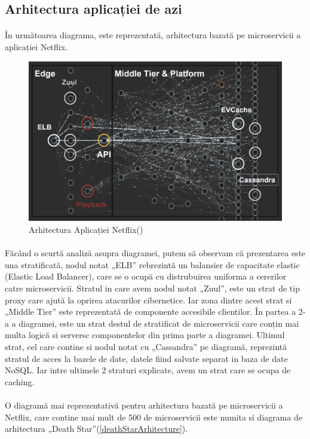\documentclass[12pt]{report}
\begin{document}
	\subsection{Arhitectura aplicației de azi}
	\paragraph{}În următoarea diagrama, este reprezentată, arhitectura bazată pe microservicii a aplicației Netflix.
	\begin{figure}[h]
  	\includegraphics[scale=.651]{netflixarhitecuture}
	\caption{Arhitectura Aplicației Netflix()}  
  	\end{figure}
  	\paragraph{}Făcând o scurtă analiză asupra diagramei, putem să observam că prezentarea este una stratificată, nodul notat „ELB” rebrezintă un balansier de capacitate elastic (Elastic Load Balancer), care se o ocupă cu distrubuirea uniforma a cererilor catre microservicii. Stratul in care avem nodul notat „Zuul”, este un strat de tip proxy care ajută la oprirea atacurilor cibernetice. Iar zona dintre acest strat si „Middle Tier” este reprezentată de componente accesibile clientilor. În partea a 2-a a diagramei, este un strat destul de stratificat de microservicii care conțin mai multa logică si serversc componentelor din prima parte a diagramei. Ultimul strat, cel care contine si nodul notat cu „Cassandra” pe diagramă, reprezintă stratul de acces la bazele de date, datele fiind salvate separat in baza de date NoSQL. Iar intre ultimele 2 straturi   explicate, avem un strat care se ocupa de caching.
  	\paragraph{}O diagramă mai reprezentativă pentru arhitectura bazată pe microservicii a Netflix, care contine mai mult de 500 de microservicii este numita si diagrama de arhitectura „Death Star”(\ref{deathStarArhitecture}).
\end{document}
